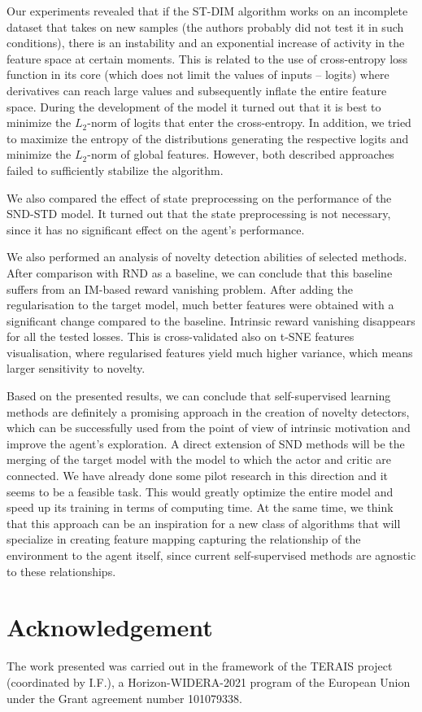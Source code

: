 \documentclass[a4paper,11pt]{elsarticle}
\begin{document}
Our experiments revealed that if the ST-DIM algorithm works on an incomplete dataset that takes on new samples (the authors probably did not test it in such conditions), there is an instability and an exponential increase of activity in the feature space at certain moments. This is related to the use of cross-entropy loss function in its core (which does not limit the values of inputs -- logits) where derivatives can reach large values and subsequently inflate the entire feature space. During the development of the model it turned out that it is best to minimize the $L_2$-norm of logits that enter the cross-entropy. In addition, we tried to maximize the entropy of the distributions generating the respective logits and minimize the $L_2$-norm of global features. However, both described approaches failed to sufficiently stabilize the algorithm.

We also compared the effect of state preprocessing on the performance of the SND-STD model. It turned out that the state preprocessing is not necessary, since it has no significant effect on the agent's performance.

We also performed an analysis of novelty detection abilities of selected methods. After comparison with RND as a baseline, we can conclude that this baseline suffers from an IM-based reward vanishing problem. After adding the regularisation to the target model, much better features were obtained with a significant change compared to the baseline. Intrinsic reward vanishing disappears for all the tested losses. This is cross-validated also on t-SNE features visualisation, where regularised features yield much higher variance, which means larger sensitivity to novelty.

Based on the presented results, we can conclude that self-supervised learning methods are definitely a promising approach in the creation of novelty detectors, which can be successfully used from the point of view of intrinsic motivation and improve the agent's exploration. A direct extension of SND methods will be the merging of the target model with the model to which the actor and critic are connected. We have already done some pilot research in this direction and it seems to be a feasible task. This would greatly optimize the entire model and speed up its training in terms of computing time.
At the same time, we think that this approach can be an inspiration for a new class of algorithms that will specialize in creating feature mapping capturing the relationship of the environment to the agent itself, since current self-supervised methods are agnostic to these relationships.

\section*{Acknowledgement}

\noindent
The work presented was carried out in the framework of the TERAIS project (coordinated by I.F.), a Horizon-WIDERA-2021 program of the European Union under the Grant agreement number 101079338.
\vspace{3,16314mm}
  
 
\end{document}
